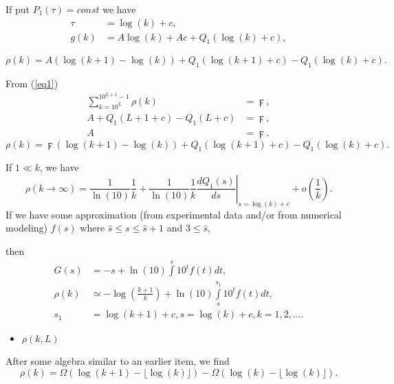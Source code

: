 \documentclass[titlepage,fleqn]{article}%
\begin{document}
If put $P_{1}(\tau)=const$ we have%
\begin{align*}
\tau &  =\log(k)+c,\\
g(k)  &  =A\log(k)+Ac+Q_{1}(\log(k)+c),
\end{align*}
%

\begin{equation}
\rho(k)=A\left(  \log(k+1)-\log(k)\right)  +Q_{1}(\log(k+1)+c)-Q_{1}%
(\log(k)+c). \label{SolK0}%
\end{equation}


From (\ref{eq1})
\begin{align}%
{\displaystyle\sum\limits_{k=10^{L}}^{10^{L+1}-1}}
\rho(k)  &  =\digamma,\\
A+Q_{1}(L+1+c)-Q_{1}(L+c)  &  =\digamma,\nonumber\\
A  &  =\digamma.\nonumber
\end{align}%
\begin{equation}
\rho(k)=\digamma\left(  \log(k+1)-\log(k)\right)  +Q_{1}(\log(k+1)+c)-Q_{1}%
(\log(k)+c). \label{SolK}%
\end{equation}


If $1\ll k$, we have%
\begin{equation}
\rho(k\rightarrow\infty)=\frac{1}{\ln(10)}\frac{1}{k}+\frac{1}{\ln(10)}%
\frac{1}{k}\left.  \frac{dQ_{1}(s)}{ds}\right\vert _{s=\log(k)+c}+o\left(
\frac{1}{k}\right)  . \label{AsymptK}%
\end{equation}
If we have some approximation (from experimental data and/or from numerical
modeling) $f(s)$ where $\hat{s}\leq s\leq\hat{s}+1$ and $3\leq\hat{s}$,

\noindent then%
\begin{align*}
G(s)  &  =-s+\ln(10)%
{\displaystyle\int\limits^{s}}
10^{t}f(t)dt,\\
\rho(k)  &  \simeq-\log\left(  \frac{k+1}{k}\right)  +\ln(10)%
{\displaystyle\int\limits_{s}^{s_{1}}}
10^{t}f(t)dt,\\
s_{1}  &  =\log\left(  k+1\right)  +c,s=\log\left(  k\right)  +c,k=1,2,\ldots.
\end{align*}


\begin{itemize}
\item $\rho(k,L)$
\end{itemize}

After some algebra similar to an earlier item, we find%
\begin{equation}
\rho(k)=\Omega(\log(k+1)-\lfloor\log(k)\rfloor)-\Omega(\log(k)-\lfloor
\log(k)\rfloor). \label{SolK_L}%
\end{equation}
\end{document}
